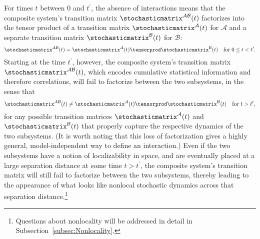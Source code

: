 \documentclass[12pt,english,prl,superscriptaddress,nobibnotes,nofootinbib]{revtex4-2}
\let\originalleft\left
\let\originalright\right
\renewcommand{\left}{\mathopen{}\mathclose\bgroup\originalleft}
\renewcommand{\right}{\aftergroup\egroup\originalright}
\begin{document}
For times $t$ between $0$ and $t^{\prime}$, the absence of interactions
means that the composite system's transition matrix $\stochasticmatrix^{\mathcal{A}\mathcal{B}}\left(t\right)$
factorizes into the tensor product of a transition matrix $\stochasticmatrix^{\mathcal{A}}\left(t\right)$
for $\mathcal{A}$ and a separate transition matrix $\stochasticmatrix^{\mathcal{B}}\left(t\right)$
for $\mathcal{B}$: 
\begin{equation}
\stochasticmatrix^{\mathcal{A}\mathcal{B}}\left(t\right)=\stochasticmatrix^{\mathcal{A}}\left(t\right)\tensorprod\stochasticmatrix^{\mathcal{B}}\left(t\right)\quad\textrm{for }0\leq t<t^{\prime}.\label{eq:SubsystemsFactorizableStochasticMatrixBeforeEntanglement}
\end{equation}
 Starting at the time $t^{\prime}$, however, the composite system's
transition matrix $\stochasticmatrix^{\mathcal{A}\mathcal{B}}\left(t\right)$,
which encodes cumulative statistical information and therefore correlations,
will fail to factorize between the two subsystems, in the sense that
\begin{equation}
\stochasticmatrix^{\mathcal{A}\mathcal{B}}\left(t\right)\ne\stochasticmatrix^{\mathcal{A}}\left(t\right)\tensorprod\stochasticmatrix^{\mathcal{B}}\left(t\right)\quad\textrm{for }t>t^{\prime},\label{eq:SubsystemsNotFactorizableStochasticMatrixAfterEntanglement}
\end{equation}
 for any possible transition matrices $\stochasticmatrix^{\mathcal{A}}\left(t\right)$
and $\stochasticmatrix^{\mathcal{B}}\left(t\right)$ that properly
capture the respective dynamics of the two subsystems. (It is worth
noting that this loss of factorization gives a highly general, model-independent
way to define an interaction.) Even if the two subsystems have a notion
of localizability in space, and are eventually placed at a large separation
distance at some time $t>t^{\prime}$, the composite system's transition
matrix will still fail to factorize between the two subsystems, thereby
leading to the appearance of what looks like nonlocal stochastic dynamics
across that separation distance.\footnote{Questions about nonlocality will be addressed in detail in Subsection~\ref{subsec:Nonlocality}.}
\end{document}
